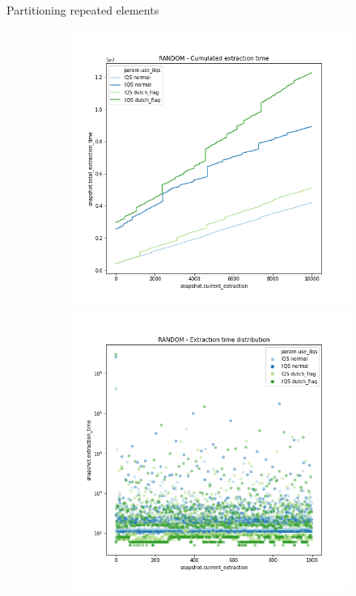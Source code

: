 \documentclass{beamer}
\begin{document}
\begin{frame}{Partitioning repeated elements}
    \begin{figure}
        \centering
        \begin{subfigure}[b]{\textwidth}
            \centering
            \includegraphics[height=0.4\textheight]{chapter4/02-basebenchmark-01-base-benchmark.png.0-0.png}
            \includegraphics[height=0.4\textheight]{chapter4/02-basebenchmark-01-base-benchmark.png.1-1.png}

\end{subfigure}
\end{figure}
\end{frame}
\end{document}
